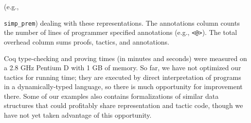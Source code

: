 \documentclass[preprint,nocopyrightspace]{sigplanconf}
\newcommand{\cd}[1]{\texttt{#1}}
\begin{document}
(e.g., {\cd{simp\_prem}) dealing with these representations.
The annotations column counts the number of lines of
programmer specified annotations (e.g., \cd{<@>}).  The total
overhead column sums proofs, tactics, and annotations.


Coq type-checking and proving times (in minutes and seconds) were measured
on a 2.8 GHz Pentium D with 1 GB of memory.  So far, we have not
optimized our tactics for running time; they are executed by direct
interpretation of programs in a dynamically-typed language, so
there is much opportunity for improvement there.  Some of our examples
also contains formalizations of similar data structures that could
profitably share representation and tactic code, though we have not yet
taken advantage of this opportunity.

}
\end{document}
